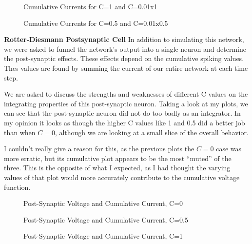 \documentclass[a4paper,12pt]{article}
\begin{document}
\begin{figure}[h!]
\caption{\label{pict1}Cumulative Currents for C=1 and C=0.01x1}
\end{figure}

\begin{figure}[h!]
\caption{\label{pict1}Cumulative Currents for C=0.5 and C=0.01x0.5}
\end{figure}

\vfil\eject

\bigskip
{\bf Rotter-Diesmann Postsynaptic Cell}
\bigskip
In addition to simulating this network, we were asked to funnel the network's output into a single neuron and determine the post-synaptic effects. These effects depend on the cumulative spiking values. Thes values are found by summing the current of our entire network at each time step. 

\vspace{2mm}

We are asked to discuss the strengths and weaknesses of different C values on the integrating properties of this post-synaptic neuron. Taking a look at my plots, we can see that the post-synaptic neuron did not do too badly as an integrator. In my opinion it looks as though the higher C values like 1 and 0.5 did a better job than when $C=0$, although we are looking at a small slice of the overall behavior.

\vspace{2mm}

I couldn't really give a reason for this, as the previous plots the $C=0$ case was more erratic, but its cumulative plot appears to be the most ``muted'' of the three. This is the opposite of what I expected, as I had thought the varying values of that plot would more accurately contribute to the cumulative voltage function. 
\begin{center}

\begin{figure}[h!]
\caption{\label{pict1}Post-Synaptic Voltage and Cumulative Current, C=0}
\end{figure}

\begin{figure}[h!]
\caption{\label{pict1}Post-Synaptic Voltage and Cumulative Current, C=0.5}
\end{figure}


\begin{figure}[h!]
\caption{\label{pict1}Post-Synaptic Voltage and Cumulative Current, C=1}
\end{figure}
\end{center}
\vfil\eject
\end{document}
